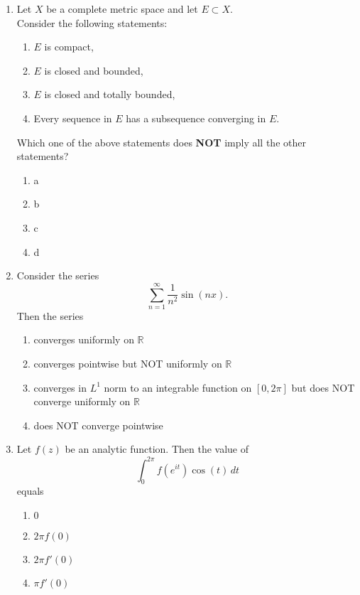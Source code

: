 \documentclass[journal]{IEEEtran}
\numberwithin{equation}{enumi}
\numberwithin{figure}{enumi}
\begin{document}
\begin{enumerate}
\item Let $X$ be a complete metric space and let $E \subset X$.
\\Consider the following statements:   \hfill{}

\begin{enumerate}
  \item $E$ is compact,
  \item $E$ is closed and bounded,
  \item $E$ is closed and totally bounded,
  \item Every sequence in $E$ has a subsequence converging in $E$.
\end{enumerate}


Which one of the above statements does \textbf{NOT} imply all the other statements?
\begin{multicols}{4}
\begin{enumerate}
    \item a
    \item b
    \item c
    \item d
\end{enumerate}
\end{multicols}


\item Consider the series
\[
\sum_{n=1}^{\infty} \frac{1}{n^2} \sin(nx).
\]
Then the series   \hfill{}

\begin{enumerate}
  \item converges uniformly on $\mathbb{R}$
  \item converges pointwise but NOT uniformly on $\mathbb{R}$
  \item converges in $L^1$ norm to an integrable function on $[0, 2\pi]$ but does NOT converge uniformly on $\mathbb{R}$
  \item does NOT converge pointwise
\end{enumerate}



\item Let $f(z)$ be an analytic function. Then the value of  \hfill{}
\[
\int_0^{2\pi} f(e^{it}) \cos(t)\,dt
\]
equals  
\begin{multicols}{4}
\begin{enumerate}
    \item $0$
    \item $2\pi f(0)$
    \item $2\pi f'(0)$
    \item $\pi f'(0)$
\end{enumerate}
\end{multicols}



\end{enumerate}
\end{document}
